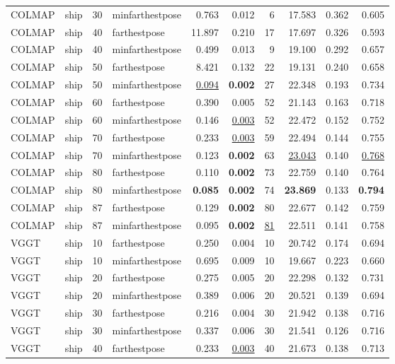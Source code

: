 \begin{table}[H]
\begin{tabular}{llrlrrrrrr}
COLMAP & ship & 30 & minfarthestpose & 0.763 & 0.012 & 6 & 17.583 & 0.362 & 0.605 \\
COLMAP & ship & 40 & farthestpose & 11.897 & 0.210 & 17 & 17.697 & 0.326 & 0.593 \\
COLMAP & ship & 40 & minfarthestpose & 0.499 & 0.013 & 9 & 19.100 & 0.292 & 0.657 \\
COLMAP & ship & 50 & farthestpose & 8.421 & 0.132 & 22 & 19.131 & 0.240 & 0.658 \\
COLMAP & ship & 50 & minfarthestpose & \underline{0.094} & \textbf{0.002} & 27 & 22.348 & 0.193 & 0.734 \\
COLMAP & ship & 60 & farthestpose & 0.390 & 0.005 & 52 & 21.143 & 0.163 & 0.718 \\
COLMAP & ship & 60 & minfarthestpose & 0.146 & \underline{0.003} & 52 & 22.472 & 0.152 & 0.752 \\
COLMAP & ship & 70 & farthestpose & 0.233 & \underline{0.003} & 59 & 22.494 & 0.144 & 0.755 \\
COLMAP & ship & 70 & minfarthestpose & 0.123 & \textbf{0.002} & 63 & \underline{23.043} & 0.140 & \underline{0.768} \\
COLMAP & ship & 80 & farthestpose & 0.110 & \textbf{0.002} & 73 & 22.759 & 0.140 & 0.764 \\
COLMAP & ship & 80 & minfarthestpose & \textbf{0.085} & \textbf{0.002} & 74 & \textbf{23.869} & 0.133 & \textbf{0.794} \\
COLMAP & ship & 87 & farthestpose & 0.129 & \textbf{0.002} & 80 & 22.677 & 0.142 & 0.759 \\
COLMAP & ship & 87 & minfarthestpose & 0.095 & \textbf{0.002} & \underline{81} & 22.511 & 0.141 & 0.758 \\
VGGT & ship & 10 & farthestpose & 0.250 & 0.004 & 10 & 20.742 & 0.174 & 0.694 \\
VGGT & ship & 10 & minfarthestpose & 0.695 & 0.009 & 10 & 19.667 & 0.223 & 0.660 \\
VGGT & ship & 20 & farthestpose & 0.275 & 0.005 & 20 & 22.298 & 0.132 & 0.731 \\
VGGT & ship & 20 & minfarthestpose & 0.389 & 0.006 & 20 & 20.521 & 0.139 & 0.694 \\
VGGT & ship & 30 & farthestpose & 0.216 & 0.004 & 30 & 21.942 & 0.138 & 0.716 \\
VGGT & ship & 30 & minfarthestpose & 0.337 & 0.006 & 30 & 21.541 & 0.126 & 0.716 \\
VGGT & ship & 40 & farthestpose & 0.233 & \underline{0.003} & 40 & 21.673 & 0.138 & 0.713 \\

\end{tabular}
\end{table}
